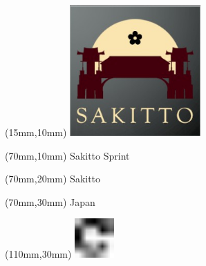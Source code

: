 \null\newpage
\begin{textblock*}{50mm}(15mm,10mm)%
\includegraphics[width=50mm]{LG/2015-05-20_00093.png}
\end{textblock*}
\begin{textblock*}{130mm}(70mm,10mm)%
{\fontsize{20}{20}\selectfont Sakitto Sprint}\\
\end{textblock*}
\begin{textblock*}{120mm}(70mm,20mm)%
{\fontsize{16}{16}\selectfont Sakitto}\\
\end{textblock*}
\begin{textblock*}{120mm}(70mm,30mm)%
{\fontsize{12}{12}\selectfont Japan}
\end{textblock*}
\begin{textblock*}{30mm}(110mm,30mm)%
\centering
\includegraphics[height=15mm]{icons/fa-rotate-right.pdf}
\end{textblock*}
